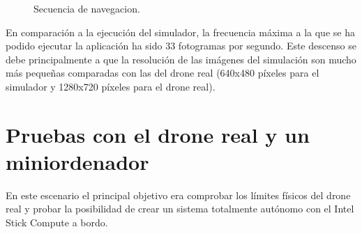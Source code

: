 \begin{figure}[H]
	\begin{center}
		\centering
		\hspace{5mm}
		\caption{Secuencia de navegacion.}
		\label{fig:navegacionReal2}	
	\end{center}
\end{figure}

En comparación a la ejecución del simulador, la frecuencia máxima a la que se ha podido ejecutar la aplicación ha sido 33 fotogramas por segundo. Este descenso se debe principalmente a que la resolución de las imágenes del simulación son mucho más pequeñas comparadas con las del drone real (640x480 píxeles para el simulador y 1280x720 píxeles para el drone real).

\section{Pruebas con el drone real y un miniordenador}

En este escenario el principal objetivo era comprobar los límites físicos del drone real y probar la posibilidad de crear un sistema totalmente autónomo con el Intel Stick Compute a bordo. 

